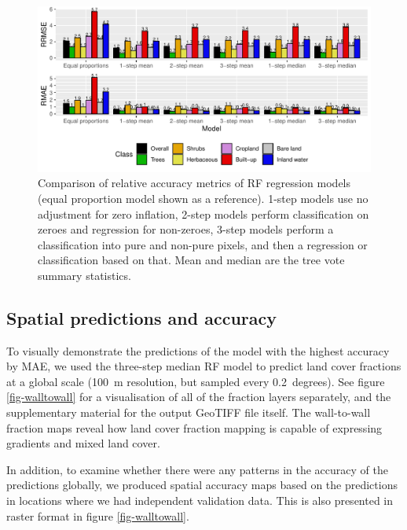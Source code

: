 \documentclass[review,authoryear,3p]{elsarticle}
\begin{document}
\begin{figure}
    \centering
    \includegraphics[width=\textwidth]{article-figures/barplots/2020-11-02-rf-comparison-bar}
    \caption{Comparison of relative accuracy metrics of RF regression models (equal proportion model shown as a reference). 1-step models use no adjustment for zero inflation, 2-step models perform classification on zeroes and regression for non-zeroes, 3-step models perform a classification into pure and non-pure pixels, and then a regression or classification based on that. Mean and median are the tree vote summary statistics.}
    \label{fig-randomforest-relative}
\end{figure}

\subsection{Spatial predictions and accuracy}

To visually demonstrate the predictions of the model with the highest accuracy by \gls{MAE}, we used the three-step median \gls{RF} model to predict land cover fractions at a global scale (100~m resolution, but sampled every 0.2~degrees).
See figure \ref{fig-walltowall} for a visualisation of all of the fraction layers separately, and the supplementary material for the output GeoTIFF file itself.
The wall-to-wall fraction maps reveal how land cover fraction mapping is capable of expressing gradients and mixed land cover.

In addition, to examine whether there were any patterns in the accuracy of the predictions globally, we produced spatial accuracy maps based on the predictions in locations where we had independent validation data.
This is also presented in raster format in figure \ref{fig-walltowall}.
\end{document}

